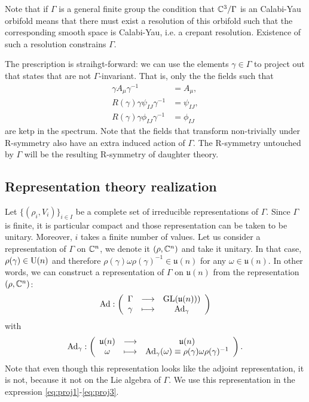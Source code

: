 \documentclass[a4paper,11pt]{article}
\begin{document}
        Note that if $\Gamma$ is a general finite group the condition that $\mathbb{C}^3/\Gamma$ is an Calabi-Yau orbifold means that there must exist a resolution of this orbifold such that the corresponding smooth space is Calabi-Yau, i.e. a crepant resolution. Existence of such a resolution constrains $\Gamma$\marker.

        The prescription is straihgt-forward: we can use the elements $\gamma\in\Gamma$ to project out that states that are not $\Gamma$-invariant. That is, only the the fields such that
        \begin{align}
            \gamma A_\mu \gamma^{-1} &= A_\mu,\label{eq:proj1}\\
            R(\gamma)\gamma \psi_{IJ} \gamma^{-1} &= \psi_{IJ}\label{eq:proj2},\\
            R(\gamma)\gamma \phi_{IJ} \gamma^{-1} &= \phi_{IJ}\label{eq:proj3}
        \end{align}
        are ketp in the spectrum. Note that the fields that transform non-trivially under R-symmetry also have an extra induced action of $\Gamma$. The R-symmetry untouched by $\Gamma$ will be the resulting R-symmetry of daughter theory.

    \subsection{Representation theory realization}

        Let $\{(\rho_i,V_i)\}_{i\in I}$ be a complete set of irreducible representations of $\Gamma$. Since $\Gamma$ is finite, it is particular compact and those representation can be taken to be unitary. Moreover, $i$ takes a finite number of values. Let us consider a representation of $\Gamma$ on $\mathbb{C}^n$, we denote it $(\rho,\mathbb{C}^n)$ and take it unitary. In that case, $\rho(\gamma)\in\text{U}(n)$ and therefore $\rho(\gamma)\omega\rho(\gamma)^{-1}\in\mathfrak{u}(n)$ for any $\omega\in\mathfrak{u}(n)$. In other words, we can construct a representation of $\Gamma$ on $\mathfrak{u}(n)$ from the representation $(\rho,\mathbb{C}^n)$:
        \begin{equation}
            \text{Ad}:\left(
            \begin{array}{ccc}
                \Gamma & \longrightarrow & \text{GL}(\mathfrak{u}(n))) \\
                \gamma & \longmapsto & \text{Ad}_\gamma
            \end{array}
            \right)
        \end{equation}
        with
        \begin{equation}
            \text{Ad}_\gamma:\left(
            \begin{array}{ccc}
                \mathfrak{u}(n) & \longrightarrow & \mathfrak{u}(n) \\
                \omega & \longmapsto & \text{Ad}_\gamma(\omega)\equiv\rho(\gamma)\omega\rho(\gamma)^{-1}
            \end{array}
            \right).
        \end{equation}
        Note that even though this representation looks like the adjoint representation, it is not, because it not on the Lie algebra of $\Gamma$. We use this representation in the expression \eqref{eq:proj1}-\eqref{eq:proj3}.
\end{document}
